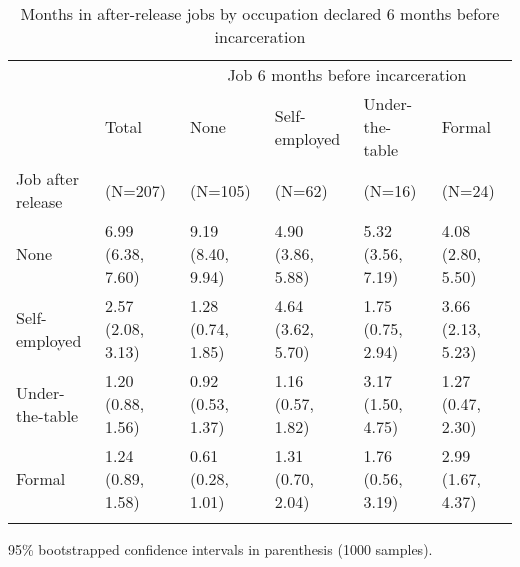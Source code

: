 
\begin{table}[htp]
\renewcommand{\arraystretch}{1.1}
\setlength{\tabcolsep}{6pt}
\centering
\scriptsize
\caption{Months in after-release jobs by occupation declared 6 months before incarceration} 
\label{tab:prejobs}
\begin{threeparttable}
\begin{tabular}{llllll}
 \hline
 \addlinespace
 & & \multicolumn{4}{c}{Job 6 months before incarceration} \\
 \addlinespace
 \cmidrule(lr){3-6} 
\addlinespace
 & Total & None & Self-employed & Under-the-table & Formal \\
Job after release  & \multicolumn{1}{l}{(N=207)} & \multicolumn{1}{l}{(N=105)} & \multicolumn{1}{l}{(N=62)}  &
\multicolumn{1}{l}{(N=16)} & \multicolumn{1}{l}{(N=24)} \\
\addlinespace
  \hline
 \addlinespace
None & 6.99 (6.38, 7.60) & 9.19 (8.40, 9.94) & 4.90 (3.86, 5.88) & 5.32 (3.56, 7.19) & 4.08 (2.80, 5.50) \\ 
  Self-employed & 2.57 (2.08, 3.13) & 1.28 (0.74, 1.85) & 4.64 (3.62, 5.70) & 1.75 (0.75, 2.94) & 3.66 (2.13, 5.23) \\ 
  Under-the-table & 1.20 (0.88, 1.56) & 0.92 (0.53, 1.37) & 1.16 (0.57, 1.82) & 3.17 (1.50, 4.75) & 1.27 (0.47, 2.30) \\ 
  Formal & 1.24 (0.89, 1.58) & 0.61 (0.28, 1.01) & 1.31 (0.70, 2.04) & 1.76 (0.56, 3.19) & 2.99 (1.67, 4.37) \\ 
  
\addlinespace
   \hline
\end{tabular}
\begin{tablenotes}
\item 95\% bootstrapped confidence intervals in parenthesis (1000 samples).
\end{tablenotes}
\end{threeparttable}
\end{table}
